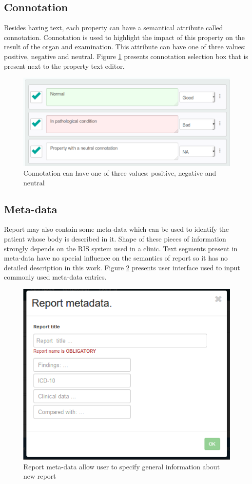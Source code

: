 \documentclass[12pt, twoside, openany]{report}
\theoremstyle{definition}
\begin{document}
\subsection{Connotation}
Besides having text, each property can have a semantical attribute called connotation. Connotation is used to highlight the impact of this property on the result of the organ and examination. This attribute can have one of three values: positive, negative and neutral. Figure \ref{fig:property-connotation} presents connotation selection box that is present next to the property text editor. 
\begin{figure}
	\centering
	\includegraphics[width=0.8\linewidth]{property-connotation}
	\caption{Connotation can have one of three values: positive, negative and neutral
		\label{fig:property-connotation}
	}
\end{figure}

\subsection{Meta-data}
Report may also contain some meta-data which can be used to identify the patient whose body is described in it. Shape of these pieces of information strongly depends on the RIS system used in a clinic. Text segments present in meta-data have no special influence on the semantics of report so it has no detailed description in this work. Figure \ref{fig:report-metadata} presents user interface used to input commonly used meta-data entries.
\begin{figure}
	\centering
	\includegraphics[width=0.6\linewidth]{report-metadata}
	\caption{Report meta-data allow user to specify general information about new report
    \label{fig:report-metadata}
	}
\end{figure}
\end{document}
